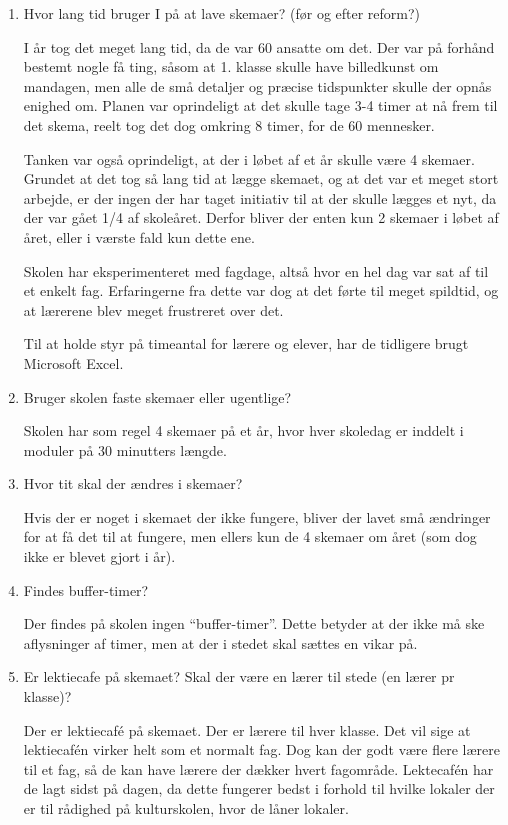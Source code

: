 \begin{enumerate}
	
	\item Hvor lang tid bruger I på at lave skemaer? (før og efter reform?)

	I år tog det meget lang tid, da de var 60 ansatte om det. Der var på forhånd bestemt nogle få ting, såsom at 1. klasse skulle have billedkunst om mandagen, men alle de små detaljer og præcise tidspunkter skulle der opnås enighed om. Planen var oprindeligt at det skulle tage 3-4 timer at nå frem til det skema, reelt tog det dog omkring 8 timer, for de 60 mennesker. 

	Tanken var også oprindeligt, at der i løbet af et år skulle være 4 skemaer. Grundet at det tog så lang tid at lægge skemaet, og at det var et meget stort arbejde, er der ingen der har taget initiativ til at der skulle lægges et nyt, da der var gået 1/4 af skoleåret. Derfor bliver der enten kun 2 skemaer i løbet af året, eller i værste fald kun dette ene.

	Skolen har eksperimenteret med fagdage, altså hvor en hel dag var sat af til et enkelt fag. Erfaringerne fra dette var dog at det førte til meget spildtid, og at lærerene blev meget frustreret over det.

	Til at holde styr på timeantal for lærere og elever, har de tidligere brugt Microsoft Excel.

	
	\item Bruger skolen faste skemaer eller ugentlige?

	Skolen har som regel 4 skemaer på et år, hvor hver skoledag er inddelt i moduler på 30 minutters længde.

	\item Hvor tit skal der ændres i skemaer?

	Hvis der er noget i skemaet der ikke fungere, bliver der lavet små ændringer for at få det til at fungere, men ellers kun de 4 skemaer om året (som dog ikke er blevet gjort i år).


	\item Findes buffer-timer? 

	Der findes på skolen ingen ``buffer-timer''. Dette betyder at der ikke må ske aflysninger af timer, men at der i stedet skal sættes en vikar på.


	\item Er lektiecafe på skemaet? Skal der være en lærer til stede (en lærer pr klasse)?

	Der er lektiecaf\'e på skemaet. Der er lærere til hver klasse. Det vil sige at lektiecaf\'en virker helt som et normalt fag. Dog kan der godt være flere lærere til et fag, så de kan have lærere der dækker hvert fagområde. Lektecaf\'en har de lagt sidst på dagen, da dette fungerer bedst i forhold til hvilke lokaler der er til rådighed på kulturskolen, hvor de låner lokaler.


\end{enumerate}
